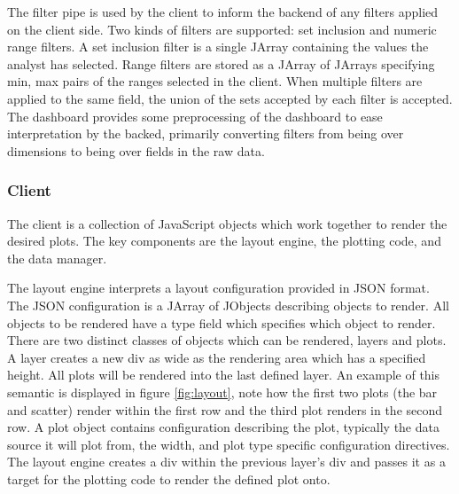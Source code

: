\documentclass[letter,twocolumn]{article}
\begin{document}
The filter pipe is used by the client to inform the backend of any filters applied on the client side.
Two kinds of filters are supported: set inclusion and numeric range filters.
A set inclusion filter is a single JArray containing the values the analyst has selected.
Range filters are stored as a JArray of JArrays specifying min, max pairs of the ranges selected in the client.
When multiple filters are applied to the same field, the union of the sets accepted by each filter is accepted.
The dashboard provides some preprocessing of the dashboard to ease interpretation by the backed, primarily converting filters from being over dimensions to being over fields in the raw data.

\subsubsection{Client}\label{sec:client}

The client is a collection of JavaScript objects which work together to render the desired plots.
The key components are the layout engine,  the plotting code, and the data manager.

The layout engine interprets a layout configuration provided in JSON format.
The JSON configuration is a JArray of JObjects describing objects to render.
All objects to be rendered have a type field which specifies which object to render.
There are two distinct classes of objects which can be rendered, layers and plots.
A layer creates a new div as wide as the rendering area which has a specified height.
All plots will be rendered into the last defined layer.
An example of this semantic is displayed in figure \ref{fig:layout}, note how the first two plots (the bar and scatter) render within the first row and the third plot renders in the second row.
A plot object contains configuration describing the plot, typically the data source it will plot from, the width, and plot type specific configuration directives.
The layout engine creates a div within the previous layer's div and passes it as a target for the plotting code to render the defined plot onto.
\end{document}
